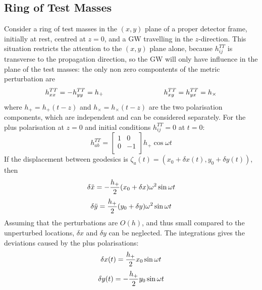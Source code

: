 \documentclass[binding=0.6cm, LaM]{sapthesis}
\begin{document}
\subsection{Ring of Test Masses}
        Consider a ring of test masses in the $(x, y)$ plane of a proper detector frame, initially at rest, centred at $z = 0$,
        and a GW travelling in the $z$-direction.
        This situation restricts the attention to the $(x,y)$ plane alone, because $h_{ij}^{TT}$ is transverse to the propagation direction,
        so the GW will only have influence in the plane of the test masses:
        the only non zero compontents of the metric perturbation are
        \begin{equation}
          h_{xx}^{TT} = - h_{yy}^{TT} = h_{+} \hspace*{3cm} h_{xy}^{TT} = h_{yx}^{TT} = h_{\times}
        \end{equation}
        where $h_{+}=h_{+}(t-z)$ and $h_{\times}=h_{\times}(t-z)$ are the two polarisation components, which are independent and can be considered separately.
        For the plus polarisation at $z=0$ and initial conditions $h_{ij}^{TT} = 0$ at $t=0$:
        \begin{equation}
          h_{ab}^{TT} = 
          \begin{bmatrix}
            1  & 0 \\
            0 &  -1 \\
          \end{bmatrix} 
          h_{+}\cos \omega t
        \end{equation}
        If the displacement between geodesics is $\zeta_a (t) = (x_0 + \delta x(t), y_0 + \delta y(t))$, then
        \begin{equation}
          \delta {\ddot x} = - {{h_{+}} \over 2} (x_0 + \delta x) \omega ^2 \sin \omega t
        \end{equation}
        \begin{equation}
          \delta {\ddot y} =  {{h_{+}} \over 2} (y_0 + \delta y) \omega ^2 \sin \omega t
        \end{equation}
        Assuming that the perturbations are $O(h)$, and thus small compared to the unperturbed locations, $\delta x$ and $\delta y$ can be neglected.
        The integrations gives the deviations caused by the plus polarisations:
        \begin{equation}
          \delta x(t) =  {{h_{+}} \over 2} x_0 \sin \omega t
        \end{equation}
        \begin{equation}
          \delta y(t) = - {{h_{+}} \over 2} y_0  \sin \omega t
        \end{equation}
\end{document}
